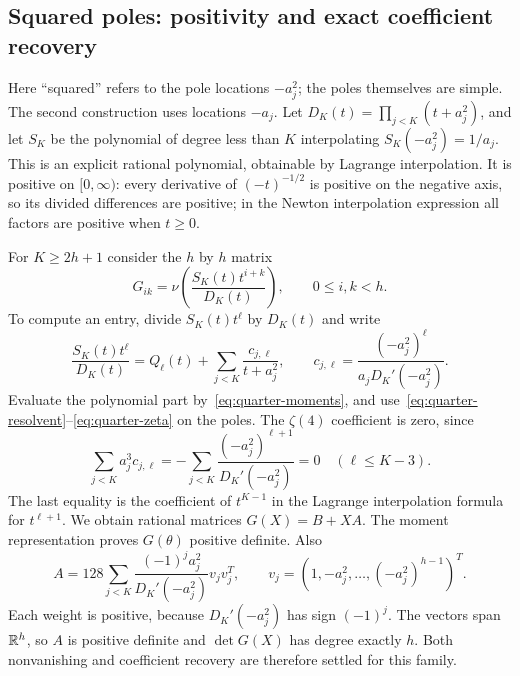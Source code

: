 \subsection{Squared poles: positivity and exact coefficient recovery}
Here ``squared'' refers to the pole locations $-a_j^2$; the poles
themselves are simple. The second construction uses locations $-a_j$.
Let $D_K(t)=\prod_{j<K}(t+a_j^2)$, and let $S_K$ be the polynomial
of degree less than $K$ interpolating $S_K(-a_j^2)=1/a_j$.
This is an explicit rational polynomial, obtainable by Lagrange
interpolation. It is positive on $[0,\infty)$: every derivative of
$(-t)^{-1/2}$ is positive on the negative axis, so its divided differences
are positive; in the Newton interpolation expression all factors are
positive when $t\geq0$.

For $K\geq2h+1$ consider the $h$ by $h$ matrix
\[
 G_{ik}=\nu\left(\frac{S_K(t)t^{i+k}}{D_K(t)}\right),\qquad0\leq i,k<h.
\]
To compute an entry, divide $S_K(t)t^\ell$ by $D_K(t)$ and write
\begin{equation}\label{eq:squared-division}
 \frac{S_K(t)t^\ell}{D_K(t)}
       =Q_\ell(t)+\sum_{j<K}\frac{c_{j,\ell}}{t+a_j^2},
 \qquad c_{j,\ell}=\frac{(-a_j^2)^\ell}{a_jD_K'(-a_j^2)}.
\end{equation}
Evaluate the polynomial part by~\eqref{eq:quarter-moments}, and
use~\eqref{eq:quarter-resolvent}--\eqref{eq:quarter-zeta} on the poles.
The $\zeta(4)$ coefficient is zero, since
\[
 \sum_{j<K}a_j^3c_{j,\ell}
   =-\sum_{j<K}\frac{(-a_j^2)^{\ell+1}}{D_K'(-a_j^2)}=0
       \quad(\ell\leq K-3).
\]
The last equality is the coefficient of $t^{K-1}$ in the Lagrange
interpolation formula for $t^{\ell+1}$. We obtain rational matrices
$G(X)=B+XA$. The moment representation proves $G(\theta)$ positive
definite. Also
\[
 A=128\sum_{j<K}\frac{(-1)^ja_j^2}{D_K'(-a_j^2)}v_jv_j^T,
 \qquad v_j=(1,-a_j^2,\ldots,(-a_j^2)^{h-1})^T.
\]
Each weight is positive, because $D_K'(-a_j^2)$ has sign $(-1)^j$.
The vectors span $\mathbb R^h$, so $A$ is positive definite and
$\det G(X)$ has degree exactly $h$. Both nonvanishing and coefficient
recovery are therefore settled for this family.

